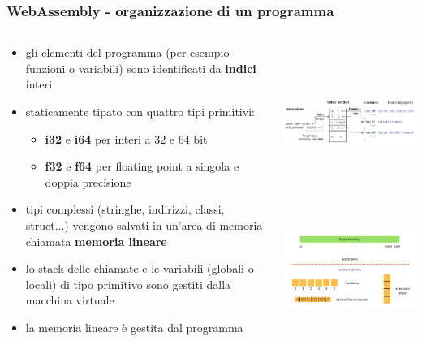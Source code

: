 \documentclass{beamer}
\newcommand\Fontvi{\fontsize{9.5}{7.2}\selectfont}
\begin{document}
\begin{frame}
  \frametitle{WebAssembly - organizzazione di un programma}
  \begin{columns}
    \Fontvi
    \begin{column}{0.6\textwidth}
  \begin{itemize}
    \item gli elementi del programma (per esempio funzioni o variabili) sono
      identificati da \textbf{indici} interi
    \item staticamente tipato con quattro tipi primitivi: 
      \begin{itemize}
        \item \textbf{i32} e \textbf{i64} per interi a 32 e 64 bit
        \item \textbf{f32} e \textbf{f64} per floating point a singola e doppia precisione
      \end{itemize}
    \item tipi complessi (stringhe, indirizzi, classi, struct...) vengono
      salvati in un'area di memoria chiamata \textbf{memoria lineare}
    \item lo stack delle chiamate e le variabili (globali o locali) di tipo
      primitivo sono gestiti dalla macchina virtuale
    \item la memoria lineare è gestita dal programma
  \end{itemize} 
  \end{column}
    \begin{column}{0.4\textwidth}
  \centerline{\includegraphics[width=5cm,height=5cm,keepaspectratio]{images/ftable.png}}
  \newline\newline\newline\newline
  \centerline{\includegraphics[width=10cm,height=3.5cm,keepaspectratio]{images/linmem.png}}
    \end{column}
  \end{columns}
\end{frame}
\end{document}

